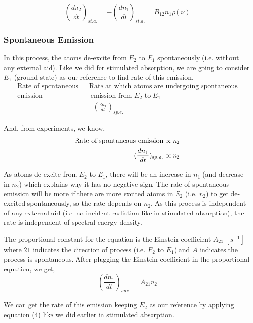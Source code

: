 \documentclass[12pt]{article}
\begin{document}
\begin{equation*}
    (\frac{dn_{2}}{dt})_{st.a.} = -(\frac{dn_{1}}{dt})_{st.a.} = B_{12}n_{1}\rho(\nu)
\end{equation*}

\subsubsection{Spontaneous Emission}

In this process, the atoms de-excite from $E_{2}$ to $E_{1}$ spontaneously (i.e. without any external aid). Like we did for stimulated absorption, we are going to consider $E_{1}$ (ground state) as our reference to find rate of this emission.
\begin{align*}
    \text{Rate of spontaneous} & = \text{Rate at which atoms are undergoing spontaneous} \\
    \text{emission} & \quad \text{emission from } E_{2} \text{ to } E_{1} \\ 
    & = (\frac{dn_{1}}{dt})_{sp.e.}
\end{align*}

And, from experiments, we know, 
\begin{align*}
    \textnormal{Rate of spontaneous emission} \propto n_{2} \\ 
    (\frac{dn_{1}}{dt})_{sp.e.} \propto n_{2}
\end{align*}

As atoms de-excite from $E_{2}$ to $E_{1}$, there will be an increase in $n_{1}$ (and decrease in $n_{2}$) which explains why it has no negative sign. The rate of spontaneous emission will be more if there are more excited atoms in $E_{2}$ (i.e. $n_{2}$) to get de-excited spontaneously, so the rate depends on $n_{2}$. As this process is independent of any external aid (i.e. no incident radiation like in stimulated absorption), the rate is independent of spectral energy density. \vspace{.2cm}

The proportional constant for the equation is the Einstein coefficient $A_{21}$ $[s^{-1}]$ where $21$ indicates the direction of process (i.e. $E_{2}$ to $E_{1}$) and $A$ indicates the process is spontaneous. After plugging the Einstein coefficient in the proportional equation, we get,
\begin{equation}
    (\frac{dn_{1}}{dt})_{sp.e.} = A_{21}n_{2}
\end{equation}

We can get the rate of this emission keeping $E_{2}$ as our reference by applying equation (4) like we did earlier in stimulated absorption.
\end{document}
